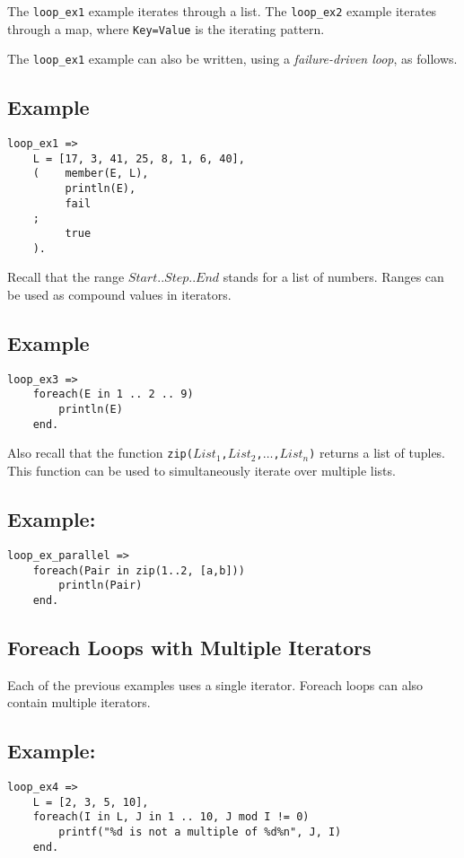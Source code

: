 The \texttt{loop\_ex1} example iterates through a list.  The \texttt{loop\_ex2} example iterates through a map, where \texttt{Key=Value} is the iterating pattern.

The \texttt{loop\_ex1} example can also be written, using a \emph{failure-driven loop}, as follows.

\subsection*{Example}
\begin{verbatim}
loop_ex1 =>
    L = [17, 3, 41, 25, 8, 1, 6, 40],
    (    member(E, L),
         println(E),
         fail
    ;
         true
    ).
\end{verbatim}


Recall that the range $Start .. Step .. End$ stands for a list of numbers.  Ranges can be used as compound values in iterators.
\subsection*{Example}
\begin{verbatim}
loop_ex3 =>
    foreach(E in 1 .. 2 .. 9)
        println(E)
    end.
\end{verbatim}

Also recall that the function \texttt{zip($List_1$,$List_2$,$\ldots$,$List_n$)} returns a list of tuples. This function can be used to simultaneously iterate over multiple lists.

\subsection*{Example:}
\begin{verbatim}
loop_ex_parallel =>
    foreach(Pair in zip(1..2, [a,b]))
        println(Pair)
    end.
\end{verbatim}


\subsection{Foreach Loops with Multiple Iterators}
Each of the previous examples uses a single iterator.  Foreach loops can also contain multiple iterators.
\subsection*{Example:}
\begin{verbatim}
loop_ex4 =>
    L = [2, 3, 5, 10],
    foreach(I in L, J in 1 .. 10, J mod I != 0)
        printf("%d is not a multiple of %d%n", J, I)
    end.
\end{verbatim}

